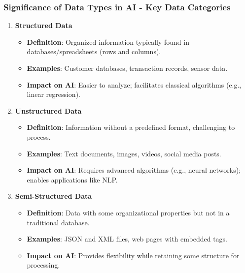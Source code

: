 \documentclass[aspectratio=169]{beamer}
\begin{document}
\begin{frame}[fragile]
    \frametitle{Significance of Data Types in AI - Key Data Categories}
    \begin{enumerate}
        \item \textbf{Structured Data}
            \begin{itemize}
                \item \textbf{Definition}: Organized information typically found in databases/spreadsheets (rows and columns).
                \item \textbf{Examples}: Customer databases, transaction records, sensor data.
                \item \textbf{Impact on AI}: Easier to analyze; facilitates classical algorithms (e.g., linear regression).
            \end{itemize}
        
        \item \textbf{Unstructured Data}
            \begin{itemize}
                \item \textbf{Definition}: Information without a predefined format, challenging to process.
                \item \textbf{Examples}: Text documents, images, videos, social media posts.
                \item \textbf{Impact on AI}: Requires advanced algorithms (e.g., neural networks); enables applications like NLP.
            \end{itemize}
        
        \item \textbf{Semi-Structured Data}
            \begin{itemize}
                \item \textbf{Definition}: Data with some organizational properties but not in a traditional database.
                \item \textbf{Examples}: JSON and XML files, web pages with embedded tags.
                \item \textbf{Impact on AI}: Provides flexibility while retaining some structure for processing.
            \end{itemize}
    \end{enumerate}
\end{frame}
\end{document}
